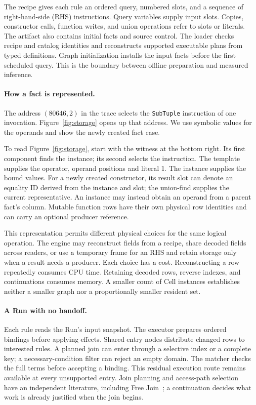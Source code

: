 \documentclass[10pt,letterpaper]{article}
\begin{document}
The recipe gives each rule an ordered query, numbered slots, and a sequence of right-hand-side (RHS) instructions. Query variables supply input slots. Copies, constructor calls, function writes, and union operations refer to slots or literals. The artifact also contains initial facts and source control. The loader checks recipe and catalog identities and reconstructs supported executable plans from typed definitions. Graph initialization installs the input facts before the first scheduled query. This is the boundary between offline preparation and measured inference.

\paragraph{How a fact is represented.}
The address \((80646,2)\) in the trace selects the \texttt{SubTuple} instruction of one invocation. Figure~\ref{fig:storage} opens up that address. We use symbolic values for the operands and show the newly created fact case.

To read Figure~\ref{fig:storage}, start with the witness at the bottom right. Its first component finds the instance; its second selects the instruction. The template supplies the operator, operand positions and literal 1. The instance supplies the bound values. For a newly created constructor, its result slot can denote an equality ID derived from the instance and slot; the union-find supplies the current representative. An instance may instead obtain an operand from a parent fact's column. Mutable function rows have their own physical row identities and can carry an optional producer reference.

This representation permits different physical choices for the same logical operation. The engine may reconstruct fields from a recipe, share decoded fields across readers, or use a temporary frame for an RHS and retain storage only when a result needs a producer. Each choice has a cost. Reconstructing a row repeatedly consumes CPU time. Retaining decoded rows, reverse indexes, and continuations consumes memory. A smaller count of Cell instances establishes neither a smaller graph nor a proportionally smaller resident set.

\paragraph{A Run with no handoff.}
Each rule reads the Run's input snapshot. The executor prepares ordered bindings before applying effects. Shared entry nodes distribute changed rows to interested rules. A planned join can enter through a selective index or a complete key; a necessary-condition filter can reject an empty domain. The matcher checks the full terms before accepting a binding. This residual execution route remains available at every unsupported entry. Join planning and access-path selection have an independent literature, including Free Join~\cite{freejoin}; a continuation decides what work is already justified when the join begins.
\end{document}
